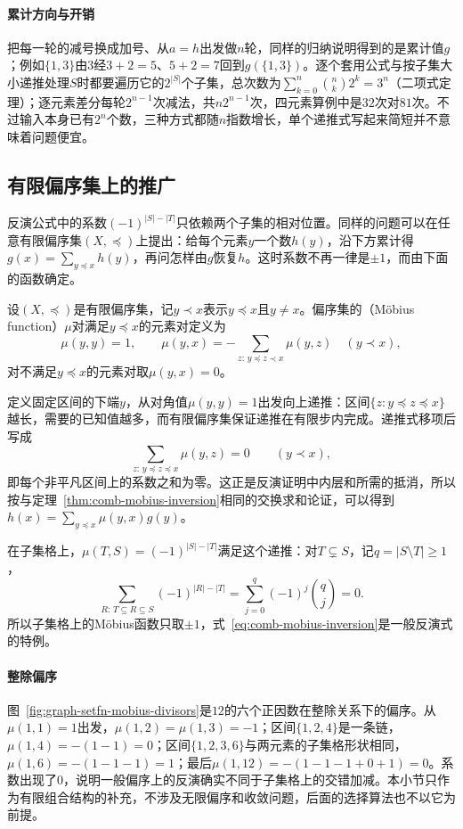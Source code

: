 \paragraph{累计方向与开销}
把每一轮的减号换成加号、从$a=h$出发做$n$轮，同样的归纳说明得到的是累计值$g$；例如$\{1,3\}$由$3$经$3+2=5$、$5+2=7$回到$g(\{1,3\})$。逐个套用公式与按子集大小递推处理$S$时都要遍历它的$2^{|S|}$个子集，总次数为$\sum_{k=0}^{n}\binom nk2^k=3^n$（二项式定理）；逐元素差分每轮$2^{n-1}$次减法，共$n2^{n-1}$次，四元素算例中是$32$次对$81$次。不过输入本身已有$2^n$个数，三种方式都随$n$指数增长，单个递推式写起来简短并不意味着问题便宜。


\subsection{有限偏序集上的推广}
\label{sec:graph-setfn-poset-mobius}

反演公式中的系数$(-1)^{|S|-|T|}$只依赖两个子集的相对位置。同样的问题可以在任意有限偏序集$(X,\preceq)$上提出：给每个元素$y$一个数$h(y)$，沿下方累计得$g(x)=\sum_{y\preceq x}h(y)$，再问怎样由$g$恢复$h$。这时系数不再一律是$\pm1$，而由下面的函数确定。

\begin{definition}[Möbius 函数]
\label{def:graph-setfn-mobius-function}
设$(X,\preceq)$是有限偏序集，记$y\prec x$表示$y\preceq x$且$y\neq x$。偏序集的（Möbius function）$\mu$对满足$y\preceq x$的元素对定义为
\[
  \mu(y,y)=1,\qquad \mu(y,x)=-\sum_{z:\,y\preceq z\prec x}\mu(y,z)\quad(y\prec x),
\]
对不满足$y\preceq x$的元素对取$\mu(y,x)=0$。
\end{definition}

定义固定区间的下端$y$，从对角值$\mu(y,y)=1$出发向上递推：区间$\{z:y\preceq z\preceq x\}$越长，需要的已知值越多，而有限偏序集保证递推在有限步内完成。递推式移项后写成
\[
  \sum_{z:\,y\preceq z\preceq x}\mu(y,z)=0\qquad(y\prec x),
\]
即每个非平凡区间上的系数之和为零。这正是反演证明中内层和所需的抵消，所以按与定理~\ref{thm:comb-mobius-inversion}相同的交换求和论证，可以得到$h(x)=\sum_{y\preceq x}\mu(y,x)g(y)$。

在子集格上，$\mu(T,S)=(-1)^{|S|-|T|}$满足这个递推：对$T\subsetneq S$，记$q=|S\setminus T|\geq1$，
\[
  \sum_{R:\,T\subseteq R\subseteq S}(-1)^{|R|-|T|}=\sum_{j=0}^{q}(-1)^j\binom qj=0.
\]
所以子集格上的Möbius函数只取$\pm1$，式~\eqref{eq:comb-mobius-inversion}是一般反演式的特例。

\paragraph{整除偏序}
图~\ref{fig:graph-setfn-mobius-divisors}是$12$的六个正因数在整除关系下的偏序。从$\mu(1,1)=1$出发，$\mu(1,2)=\mu(1,3)=-1$；区间$\{1,2,4\}$是一条链，$\mu(1,4)=-(1-1)=0$；区间$\{1,2,3,6\}$与两元素的子集格形状相同，$\mu(1,6)=-(1-1-1)=1$；最后$\mu(1,12)=-(1-1-1+0+1)=0$。系数出现了$0$，说明一般偏序上的反演确实不同于子集格上的交错加减。本小节只作为有限组合结构的补充，不涉及无限偏序和收敛问题，后面的选择算法也不以它为前提。

